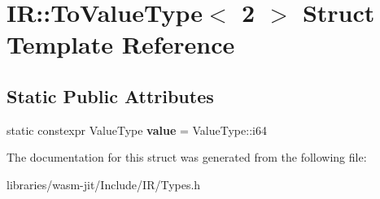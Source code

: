 \hypertarget{struct_i_r_1_1_to_value_type_3_012_01_4}{}\section{IR\+:\+:To\+Value\+Type$<$ 2 $>$ Struct Template Reference}
\label{struct_i_r_1_1_to_value_type_3_012_01_4}
\subsection*{Static Public Attributes}
\begin{DoxyCompactItemize}
\item 
\mbox{\label{struct_i_r_1_1_to_value_type_3_012_01_4_aeaa3c2dba46ff94c21076351e1edc2ab}} 
static constexpr Value\+Type {\bfseries value} = Value\+Type\+::i64
\end{DoxyCompactItemize}


The documentation for this struct was generated from the following file\+:\begin{DoxyCompactItemize}
\item 
libraries/wasm-\/jit/\+Include/\+I\+R/Types.\+h\end{DoxyCompactItemize}
